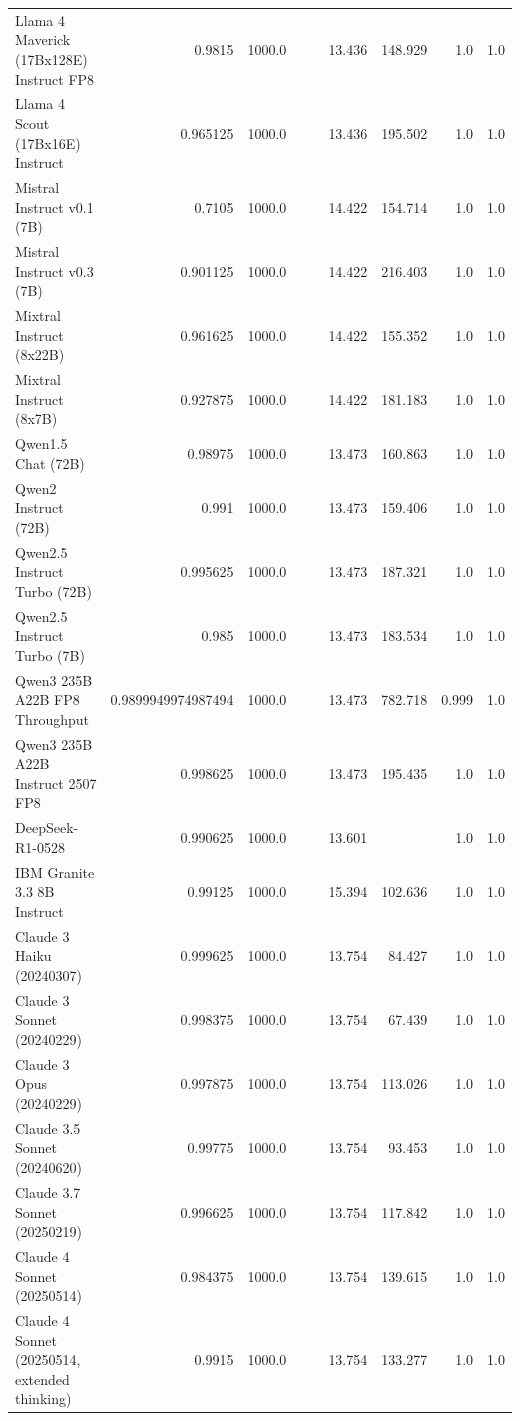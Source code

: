 \begin{table}[htp]
{\begin{tabular}{lrrrrrrrr}
Llama 4 Maverick (17Bx128E) Instruct FP8 & 0.9815 & 1000.0 &  &  & 13.436 & 148.929 & 1.0 & 1.0 \\
Llama 4 Scout (17Bx16E) Instruct & 0.965125 & 1000.0 &  &  & 13.436 & 195.502 & 1.0 & 1.0 \\
Mistral Instruct v0.1 (7B) & 0.7105 & 1000.0 &  &  & 14.422 & 154.714 & 1.0 & 1.0 \\
Mistral Instruct v0.3 (7B) & 0.901125 & 1000.0 &  &  & 14.422 & 216.403 & 1.0 & 1.0 \\
Mixtral Instruct (8x22B) & 0.961625 & 1000.0 &  &  & 14.422 & 155.352 & 1.0 & 1.0 \\
Mixtral Instruct (8x7B) & 0.927875 & 1000.0 &  &  & 14.422 & 181.183 & 1.0 & 1.0 \\
Qwen1.5 Chat (72B) & 0.98975 & 1000.0 &  &  & 13.473 & 160.863 & 1.0 & 1.0 \\
Qwen2 Instruct (72B) & 0.991 & 1000.0 &  &  & 13.473 & 159.406 & 1.0 & 1.0 \\
Qwen2.5 Instruct Turbo (72B) & 0.995625 & 1000.0 &  &  & 13.473 & 187.321 & 1.0 & 1.0 \\
Qwen2.5 Instruct Turbo (7B) & 0.985 & 1000.0 &  &  & 13.473 & 183.534 & 1.0 & 1.0 \\
Qwen3 235B A22B FP8 Throughput & 0.9899949974987494 & 1000.0 &  &  & 13.473 & 782.718 & 0.999 & 1.0 \\
Qwen3 235B A22B Instruct 2507 FP8 & 0.998625 & 1000.0 &  &  & 13.473 & 195.435 & 1.0 & 1.0 \\
DeepSeek-R1-0528 & 0.990625 & 1000.0 &  &  & 13.601 &  & 1.0 & 1.0 \\
IBM Granite 3.3 8B Instruct & 0.99125 & 1000.0 &  &  & 15.394 & 102.636 & 1.0 & 1.0 \\
Claude 3 Haiku (20240307) & 0.999625 & 1000.0 &  &  & 13.754 & 84.427 & 1.0 & 1.0 \\
Claude 3 Sonnet (20240229) & 0.998375 & 1000.0 &  &  & 13.754 & 67.439 & 1.0 & 1.0 \\
Claude 3 Opus (20240229) & 0.997875 & 1000.0 &  &  & 13.754 & 113.026 & 1.0 & 1.0 \\
Claude 3.5 Sonnet (20240620) & 0.99775 & 1000.0 &  &  & 13.754 & 93.453 & 1.0 & 1.0 \\
Claude 3.7 Sonnet (20250219) & 0.996625 & 1000.0 &  &  & 13.754 & 117.842 & 1.0 & 1.0 \\
Claude 4 Sonnet (20250514) & 0.984375 & 1000.0 &  &  & 13.754 & 139.615 & 1.0 & 1.0 \\
Claude 4 Sonnet (20250514, extended thinking) & 0.9915 & 1000.0 &  &  & 13.754 & 133.277 & 1.0 & 1.0 \\

\end{tabular}}
\end{table}

